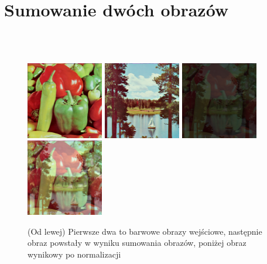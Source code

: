 \documentclass[final,a4paper,openany,12pt]{mwbk}
\begin{document}
\section {Sumowanie dwóch obrazów}
\hfill
\\\\
\indent

\begin{figure}[H]
	\begin{center}
		\includegraphics[width=0.3\textwidth]{1/1Color_Sum_Img1_Original}
		\includegraphics[width=0.3\textwidth]{1/1Color_Sum_Img2_Original}
		\includegraphics[width=0.3\textwidth]{1/1Color_Sum_Img_Result}
		\includegraphics[width=0.3\textwidth]{1/1Color_Sum_Img_Result_Norm}
	\end{center}
	\caption{(Od lewej) Pierwsze dwa to barwowe obrazy wejściowe, następnie obraz powstały w wyniku sumowania obrazów, poniżej obraz wynikowy po normalizacji }
\end{figure}
\end{document}
